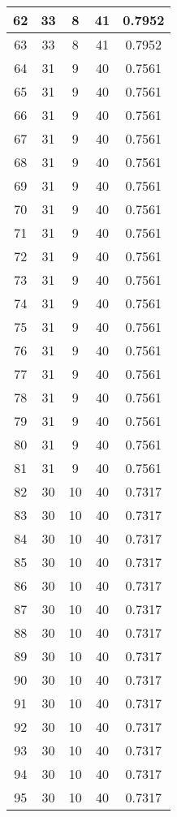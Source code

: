 \documentclass[letterpaper, 12pt]{article}
\begin{document}
\begin{longtable}{|c|c|c|c|c|}
\hline
62 & 33 & 8 & 41 & 0.7952 \\
\hline
63 & 33 & 8 & 41 & 0.7952 \\
\hline
64 & 31 & 9 & 40 & 0.7561 \\
\hline
65 & 31 & 9 & 40 & 0.7561 \\
\hline
66 & 31 & 9 & 40 & 0.7561 \\
\hline
67 & 31 & 9 & 40 & 0.7561 \\
\hline
68 & 31 & 9 & 40 & 0.7561 \\
\hline
69 & 31 & 9 & 40 & 0.7561 \\
\hline
70 & 31 & 9 & 40 & 0.7561 \\
\hline
71 & 31 & 9 & 40 & 0.7561 \\
\hline
72 & 31 & 9 & 40 & 0.7561 \\
\hline
73 & 31 & 9 & 40 & 0.7561 \\
\hline
74 & 31 & 9 & 40 & 0.7561 \\
\hline
75 & 31 & 9 & 40 & 0.7561 \\
\hline
76 & 31 & 9 & 40 & 0.7561 \\
\hline
77 & 31 & 9 & 40 & 0.7561 \\
\hline
78 & 31 & 9 & 40 & 0.7561 \\
\hline
79 & 31 & 9 & 40 & 0.7561 \\
\hline
80 & 31 & 9 & 40 & 0.7561 \\
\hline
81 & 31 & 9 & 40 & 0.7561 \\
\hline
82 & 30 & 10 & 40 & 0.7317 \\
\hline
83 & 30 & 10 & 40 & 0.7317 \\
\hline
84 & 30 & 10 & 40 & 0.7317 \\
\hline
85 & 30 & 10 & 40 & 0.7317 \\
\hline
86 & 30 & 10 & 40 & 0.7317 \\
\hline
87 & 30 & 10 & 40 & 0.7317 \\
\hline
88 & 30 & 10 & 40 & 0.7317 \\
\hline
89 & 30 & 10 & 40 & 0.7317 \\
\hline
90 & 30 & 10 & 40 & 0.7317 \\
\hline
91 & 30 & 10 & 40 & 0.7317 \\
\hline
92 & 30 & 10 & 40 & 0.7317 \\
\hline
93 & 30 & 10 & 40 & 0.7317 \\
\hline
94 & 30 & 10 & 40 & 0.7317 \\
\hline
95 & 30 & 10 & 40 & 0.7317 \\
\hline

\end{longtable}
\end{document}
